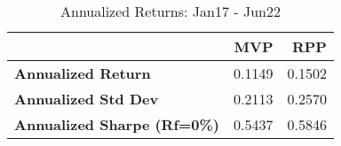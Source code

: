\begin{table}
    \centering
      \begingroup
      \fontsize{9}{9}
      \selectfont 
\begin{tabular}{>{}lrr}
\toprule
  & MVP & RPP\\
\midrule
\textbf{Annualized Return} & 0.1149 & 0.1502\\
\textbf{Annualized Std Dev} & 0.2113 & 0.2570\\
\textbf{Annualized Sharpe (Rf=0\%)} & 0.5437 & 0.5846\\
\bottomrule
\end{tabular} \caption{Annualized Returns: Jan17 - Jun22}
      \label{tab:RPPVol}  %
      \endgroup{}
      \end{table}